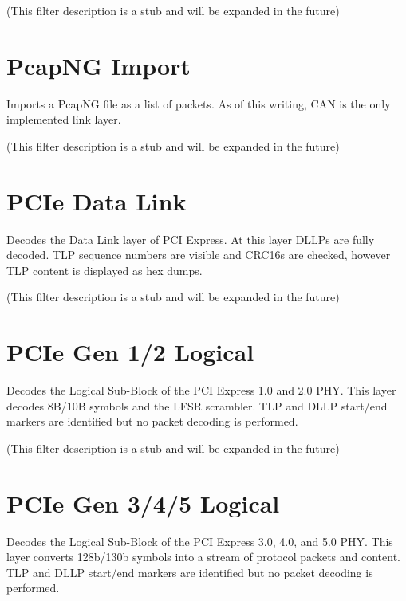 (This filter description is a stub and will be expanded in the future)

\pagebreak
\section{PcapNG Import}

Imports a PcapNG file as a list of packets. As of this writing, CAN is the only implemented link layer.

(This filter description is a stub and will be expanded in the future)

\pagebreak
\section{PCIe Data Link}

Decodes the Data Link layer of PCI Express. At this layer DLLPs are fully decoded. TLP sequence numbers are visible
and CRC16s are checked, however TLP content is displayed as hex dumps.

(This filter description is a stub and will be expanded in the future)

\pagebreak
\section{PCIe Gen 1/2 Logical}
\label{filter:pcie2_logical}

Decodes the Logical Sub-Block of the PCI Express 1.0 and 2.0 PHY. This layer decodes 8B/10B symbols and the LFSR
scrambler. TLP and DLLP start/end markers are identified but no packet decoding is performed.

(This filter description is a stub and will be expanded in the future)

\pagebreak
\section{PCIe Gen 3/4/5 Logical}

Decodes the Logical Sub-Block of the PCI Express 3.0, 4.0, and 5.0 PHY. This layer converts 128b/130b symbols into a
stream of protocol packets and content. TLP and DLLP start/end markers are identified but no packet decoding is
performed.

